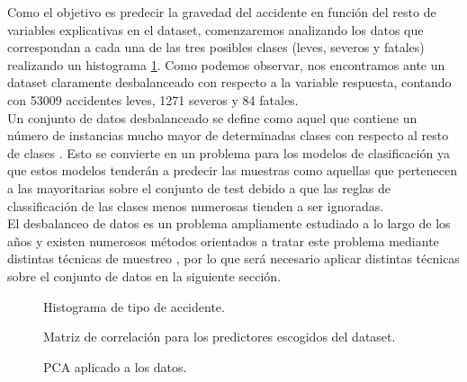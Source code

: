 \begin{enumerate}
\begin{enumerate}
                    Como el objetivo es predecir la gravedad del accidente en función del resto de variables explicativas en el dataset, comenzaremos analizando los datos que correspondan a cada una de las tres posibles clases (leves, severos y fatales) realizando un histograma \ref{CasualtyClassImage}. Como podemos observar, nos encontramos ante un dataset claramente desbalanceado con respecto a la variable respuesta, contando con 53009 accidentes leves, 1271 severos y 84 fatales.\\

                    Un conjunto de datos desbalanceado se define como aquel que contiene un número de instancias mucho mayor de determinadas clases con respecto al resto de clases \cite{WhyImbalancedDataIsAProblem}. Esto se convierte en un problema para los modelos de clasificación ya que estos modelos tenderán a predecir las muestras como aquellas que pertenecen a las mayoritarias sobre el conjunto de test debido a que las reglas de classificación de las clases menos numerosas tienden a ser ignoradas.\\

                    El desbalanceo de datos es un problema ampliamente estudiado a lo largo de los años y existen numerosos métodos orientados a tratar este problema mediante distintas técnicas de muestreo \cite{ImbalancedDataReview}, por lo que será necesario aplicar distintas técnicas sobre el conjunto de datos en la siguiente sección.


                    \begin{figure}[h]
                        \centering
                        
                        \caption{Histograma de tipo de accidente.}
                        \label{CasualtyClassImage}
                     \end{figure}


                    \begin{figure}[h]
                        \centering
                        
                        \caption{Matriz de correlación para los predictores escogidos del dataset.}
                        \label{CorrelationMatrixImage}
                     \end{figure}

                    \begin{figure}[h]
                        \centering
                        
                        \caption{PCA aplicado a los datos.}
                        \label{PCAImage}
                     \end{figure}


\end{enumerate}
\end{enumerate}
